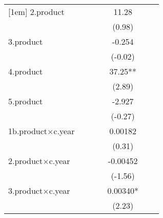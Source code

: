 {\begin{tabular}{l*{6}{c}}
[1em]
2.product           &                     &                     &                     &       11.28         &                     &                     \\
                    &                     &                     &                     &      (0.98)         &                     &                     \\
[1em]
3.product           &                     &                     &                     &      -0.254         &                     &                     \\
                    &                     &                     &                     &     (-0.02)         &                     &                     \\
[1em]
4.product           &                     &                     &                     &       37.25** &                     &                     \\
                    &                     &                     &                     &      (2.89)         &                     &                     \\
[1em]
5.product           &                     &                     &                     &      -2.927         &                     &                     \\
                    &                     &                     &                     &     (-0.27)         &                     &                     \\
[1em]
1b.product$\times$c.year   &                     &                     &                     &     0.00182         &                     &                     \\
                    &                     &                     &                     &      (0.31)         &                     &                     \\
[1em]
2.product$\times$c.year    &                     &                     &                     &    -0.00452         &                     &                     \\
                    &                     &                     &                     &     (-1.56)         &                     &                     \\
[1em]
3.product$\times$c.year    &                     &                     &                     &     0.00340*  &                     &                     \\
                    &                     &                     &                     &      (2.23)         &                     &                     \\

\end{tabular}}
